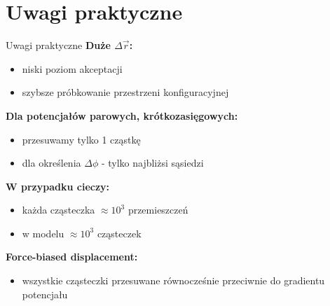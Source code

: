\section{Uwagi praktyczne}
	\begin{frame}{Uwagi praktyczne}
		\textbf{Duże $\Delta\vec{r}$:}
		\begin{itemize}
			\item niski poziom akceptacji
			\item szybsze próbkowanie przestrzeni konfiguracyjnej
		\end{itemize}
		
		\textbf{Dla potencjałów parowych, krótkozasięgowych:}
		\begin{itemize}
			\item przesuwamy tylko 1 cząstkę
			\item dla określenia $\Delta\phi$ - tylko najbliżsi sąsiedzi
		\end{itemize}
		
		\textbf{W przypadku cieczy:}
		\begin{itemize}
			\item każda cząsteczka $\approx 10^3$ przemieszczeń
			\item w modelu $\approx 10^3$ cząsteczek
		\end{itemize}	
		
		\textbf{Force-biased displacement:}
		\begin{itemize}
			\item wszystkie cząsteczki przesuwane równocześnie przeciwnie do gradientu potencjału
		\end{itemize}
		
	\end{frame}
